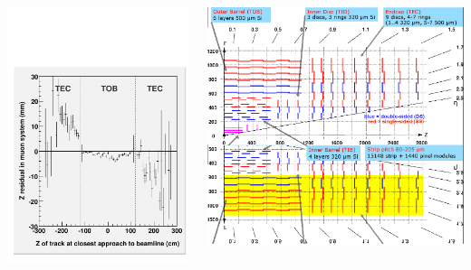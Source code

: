 \documentclass[compress]{beamer}
\begin{document}
\begin{frame}
\vfill
\begin{columns}
\includegraphics[width=\linewidth]{zresid_from_tracker_outerbottom.pdf}

\includegraphics[width=\linewidth]{tracker_map_outerbottom.png}


\end{columns}
\end{frame}
\end{document}
